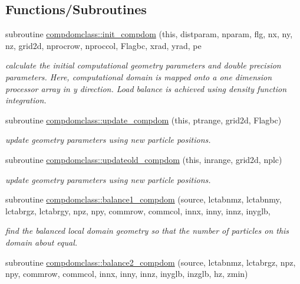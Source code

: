 \subsection*{Functions/\+Subroutines}
\begin{DoxyCompactItemize}
\item 
subroutine \mbox{\hyperlink{namespacecompdomclass_acdfdc48f4091ad70b76c1c7ed66c10b0}{compdomclass\+::init\+\_\+compdom}} (this, distparam, nparam, flg, nx, ny, nz, grid2d, nprocrow, nproccol, Flagbc, xrad, yrad, pe
\begin{DoxyCompactList}\small\item\em calculate the initial computational geometry parameters and double precision parameters. Here, computational domain is mapped onto a one dimension processor array in y direction. Load balance is achieved using density function integration. \end{DoxyCompactList}\item 
subroutine \mbox{\hyperlink{namespacecompdomclass_a0e7d562b378f77e0d3a14b33168cb46b}{compdomclass\+::update\+\_\+compdom}} (this, ptrange, grid2d, Flagbc)
\begin{DoxyCompactList}\small\item\em update geometry parameters using new particle positions. \end{DoxyCompactList}\item 
subroutine \mbox{\hyperlink{namespacecompdomclass_abf3eab7526c06e30b574ddf8be378826}{compdomclass\+::updateold\+\_\+compdom}} (this, inrange, grid2d, nplc)
\begin{DoxyCompactList}\small\item\em update geometry parameters using new particle positions. \end{DoxyCompactList}\item 
subroutine \mbox{\hyperlink{namespacecompdomclass_aab3fa2d18dbc8bc4d825e36304c4b4d8}{compdomclass\+::balance1\+\_\+compdom}} (source, lctabnmz, lctabnmy, lctabrgz, lctabrgy, npz, npy, commrow, commcol, innx, inny, innz, inyglb,
\begin{DoxyCompactList}\small\item\em find the balanced local domain geometry so that the number of particles on this domain about equal. \end{DoxyCompactList}\item 
subroutine \mbox{\hyperlink{namespacecompdomclass_a6d30ed07486cc6d7f9bf0e87f948e807}{compdomclass\+::balance2\+\_\+compdom}} (source, lctabnmz, lctabrgz, npz, npy, commrow, commcol, innx, inny, innz, inyglb, inzglb, hz, zmin)

\end{DoxyCompactItemize}
